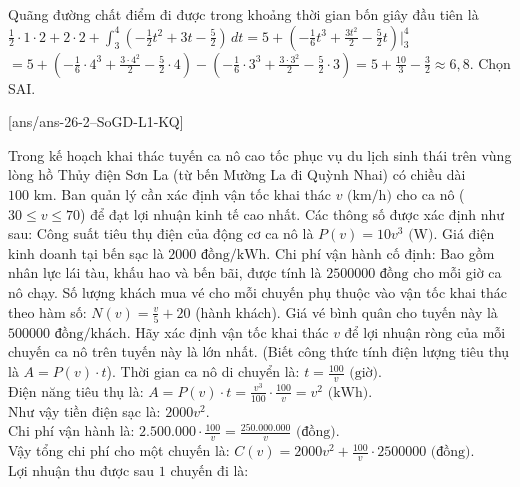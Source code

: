 \begin{ex}
{\begin{itemchoice}
			Quãng đường chất điểm đi được trong khoảng thời gian bốn giây đầu tiên là\\
			$\displaystyle \frac{1}{2} \cdot 1 \cdot 2 + 2 \cdot 2 + \int_3^4 \left(-\frac{1}{2}t^2 + 3t - \frac{5}{2}\right)\,dt = 5 + \left(-\frac{1}{6}t^3 + \frac{3t^2}{2} - \frac{5}{2}t\right) \bigg|_3^4$\\
			$\displaystyle = 5 + \left(-\frac{1}{6} \cdot 4^3 + \frac{3 \cdot 4^2}{2} - \frac{5}{2} \cdot 4\right) - \left(-\frac{1}{6} \cdot 3^3 + \frac{3 \cdot 3^2}{2} - \frac{5}{2} \cdot 3\right) = 5 + \frac{10}{3} - \frac{3}{2} \approx 6{,}8$. Chọn SAI.
		\end{itemchoice}
	}
\end{ex}

\caukq
{}[ans/ans-26-2--SoGD-L1-KQ]
\begin{ex} %
	Trong kế hoạch khai thác tuyến ca nô cao tốc phục vụ du lịch sinh thái trên vùng lòng hồ Thủy điện Sơn La (từ bến Mường La đi Quỳnh Nhai) có chiều dài $100\text{ km}$. Ban quản lý cần xác định vận tốc khai thác $v\text{ (km/h)}$ cho ca nô ($30 \le v \le 70$) để đạt lợi nhuận kinh tế cao nhất. Các thông số được xác định như sau: Công suất tiêu thụ điện của động cơ ca nô là $P(v) = 10v^3\text{ (W)}$. Giá điện kinh doanh tại bến sạc là $2000\text{ đồng/kWh}$. Chi phí vận hành cố định: Bao gồm nhân lực lái tàu, khấu hao và bến bãi, được tính là $2500000\text{ đồng}$ cho mỗi giờ ca nô chạy. Số lượng khách mua vé cho mỗi chuyến phụ thuộc vào vận tốc khai thác theo hàm số: $\displaystyle N(v) = \frac{v}{5} + 20$ (hành khách). Giá vé bình quân cho tuyến này là $500000\text{ đồng/khách}$. Hãy xác định vận tốc khai thác $v$ để lợi nhuận ròng của mỗi chuyến ca nô trên tuyến này là lớn nhất. (Biết công thức tính điện lượng tiêu thụ là $A = P(v) \cdot t$).
	\loigiai
	{
		Thời gian ca nô di chuyển là: $\displaystyle t = \frac{100}{v}\text{ (giờ)}$.\\
		Điện năng tiêu thụ là: $\displaystyle A = P(v) \cdot t = \frac{v^3}{100} \cdot \frac{100}{v} = v^2\text{ (kWh)}$.\\
		Như vậy tiền điện sạc là: $2000v^2$.\\
		Chi phí vận hành là: $\displaystyle 2.500.000 \cdot \frac{100}{v} = \frac{250.000.000}{v}\text{ (đồng)}$.\\
		Vậy tổng chi phí cho một chuyến là: $\displaystyle C(v) = 2000v^2 + \frac{100}{v} \cdot 2500000\text{ (đồng)}$.\\
		Lợi nhuận thu được sau $1$ chuyến đi là:\\
}
\end{ex}
